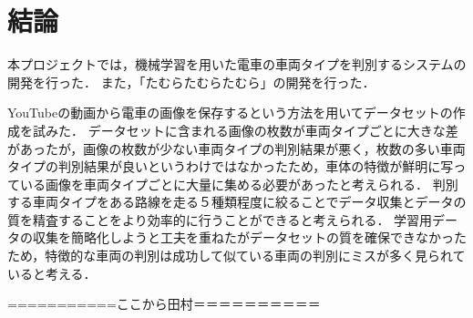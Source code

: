 

\chapter{結論}
本プロジェクトでは，機械学習を用いた電車の車両タイプを判別するシステムの開発を行った．
また，「たむらたむらたむら」の開発を行った．

YouTubeの動画から電車の画像を保存するという方法を用いてデータセットの作成を試みた．
データセットに含まれる画像の枚数が車両タイプごとに大きな差があったが，画像の枚数が少ない車両タイプの判別結果が悪く，枚数の多い車両タイプの判別結果が良いというわけではなかったため，車体の特徴が鮮明に写っている画像を車両タイプごとに大量に集める必要があったと考えられる．
判別する車両タイプをある路線を走る５種類程度に絞ることでデータ収集とデータの質を精査することをより効率的に行うことができると考えられる．
学習用データの収集を簡略化しようと工夫を重ねたがデータセットの質を確保できなかったため，特徴的な車両の判別は成功して似ている車両の判別にミスが多く見られていると考える．

===========ここから田村＝＝＝＝＝＝＝＝＝＝